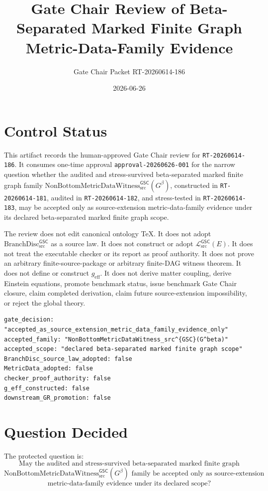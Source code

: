 \documentclass[11pt]{article}
\title{Gate Chair Review of Beta-Separated Marked Finite Graph Metric-Data-Family Evidence}
\author{Gate Chair Packet RT-20260614-186}
\date{2026-06-26}
\newcommand{\BranchDisc}{\mathrm{BranchDisc}_{\mathrm{src}}^{\mathsf{GSC}}}
\newcommand{\Witness}{\mathrm{NonBottomMetricDataWitness}_{\mathrm{src}}^{\mathsf{GSC}}}
\newcommand{\Gbeta}{G^{\beta}}
\newcommand{\MetricData}{\mathcal{L}_{\mathrm{src}}^{\mathsf{GSC}}}
\newcommand{\geff}{g_{\mathrm{eff}}}
\begin{document}
\maketitle

\section{Control Status}

This artifact records the human-approved Gate Chair review for
\texttt{RT-20260614-186}. It consumes one-time approval
\texttt{approval-20260626-001} for the narrow question whether the audited
and stress-survived beta-separated marked finite graph family
\(\Witness(\Gbeta)\), constructed in \texttt{RT-20260614-181}, audited in
\texttt{RT-20260614-182}, and stress-tested in \texttt{RT-20260614-183}, may
be accepted only as source-extension metric-data-family evidence under its
declared beta-separated marked finite graph scope.

The review does not edit canonical ontology TeX. It does not adopt
\(\BranchDisc\) as a source law. It does not construct or adopt
\(\MetricData(E)\). It does not treat the executable checker or its report as
proof authority. It does not prove an arbitrary finite-source-package or
arbitrary finite-DAG witness theorem. It does not define or construct
\(\geff\). It does not derive matter coupling, derive Einstein equations,
promote benchmark status, issue benchmark Gate Chair closure, claim completed
derivation, claim future source-extension impossibility, or reject the global
theory.

\begin{verbatim}
gate_decision: "accepted_as_source_extension_metric_data_family_evidence_only"
accepted_family: "NonBottomMetricDataWitness_src^{GSC}(G^beta)"
accepted_scope: "declared beta-separated marked finite graph scope"
BranchDisc_source_law_adopted: false
MetricData_adopted: false
checker_proof_authority: false
g_eff_constructed: false
downstream_GR_promotion: false
\end{verbatim}

\section{Question Decided}

The protected question is:
\[
\text{May the audited and stress-survived beta-separated marked finite graph}
\]
\[
\Witness(\Gbeta)\text{ family be accepted only as source-extension}
\]
\[
\text{metric-data-family evidence under its declared scope?}
\]
\end{document}
